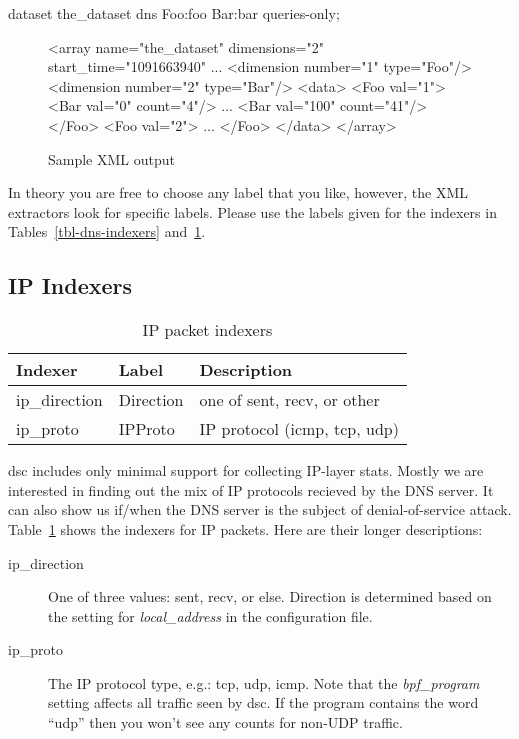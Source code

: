 \documentclass{report}
\def\dsc{{\sc dsc}}
\begin{document}
\begin{MyVerbatim}
dataset the_dataset dns Foo:foo Bar:bar queries-only;
\end{MyVerbatim}

\begin{figure}
\begin{MyVerbatim}
<array name="the_dataset" dimensions="2" start_time="1091663940" ...
  <dimension number="1" type="Foo"/>
  <dimension number="2" type="Bar"/>
  <data>
    <Foo val="1">
      <Bar val="0" count="4"/>
      ...
      <Bar val="100" count="41"/>
    </Foo>
    <Foo val="2">
      ...
    </Foo>
  </data>
</array>
\end{MyVerbatim}
\caption{\label{fig-sample-xml}Sample XML output}
\end{figure}

In theory you are free to choose any label that you like, however,
the XML extractors look for specific labels.  Please use the labels
given for the indexers in Tables~\ref{tbl-dns-indexers}
and~\ref{tbl-ip-indexers}.

\subsection{IP Indexers}

\begin{table}
\begin{center}
\begin{tabular}{|lll|}
\hline
Indexer & Label & Description \\
\hline 
ip\_direction & Direction & one of sent, recv, or other \\
ip\_proto & IPProto & IP protocol (icmp, tcp, udp) \\
\hline
\end{tabular}
\caption{\label{tbl-ip-indexers}IP packet indexers}
\end{center}
\end{table}

{\dsc} includes only minimal support for collecting IP-layer
stats.  Mostly we are interested in finding out the mix of
IP protocols recieved by the DNS server.  It can also show us
if/when the DNS server is the subject of denial-of-service
attack.
Table~\ref{tbl-ip-indexers} shows the indexers for IP packets.
Here are their longer descriptions:

\begin{description}
\item[ip\_direction]
	One of three values: sent, recv, or else.  Direction is determined
	based on the setting for {\em local\_address\/} in the configuration file.
\item[ip\_proto]
	The IP protocol type, e.g.: tcp, udp, icmp.
	Note that the {\em bpf\_program\/} setting affects all traffic
	seen by {\dsc}.  If the program contains the word ``udp''
	then you won't see any counts for non-UDP traffic.
\end{description}
\end{document}
